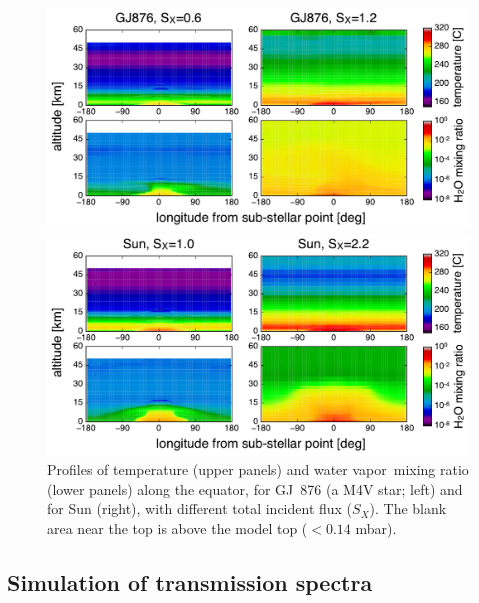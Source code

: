 \documentclass[11pt,numberedappendix,twocolappendix,]{emulateapj}
\newcommand{\wv}{{\color{orange}water vapor\ }}
\begin{document}
\begin{figure}[tb]
    \begin{minipage}{0.5\hsize}
\includegraphics[width=\hsize]{fig/AqOH0TLS_GJ876_temp_xH2O.pdf}
    \end{minipage}
    \begin{minipage}{0.5\hsize}
\includegraphics[width=\hsize]{fig/AqOH0TLS_Sun_temp_xH2O.pdf}
    \end{minipage}
    \caption{Profiles of temperature (upper panels) and \wv mixing ratio (lower panels) along the equator, for GJ~876 (a M4V star; left) and for Sun (right), with different total incident flux ($S_X$). The blank area near the top is above the model top ($< 0.14$ mbar).}
\label{fig:3Dprofile_equator}
\end{figure}


\subsection{Simulation of transmission spectra}
\label{ss:method_TransmissionSpectra}
\end{document}
